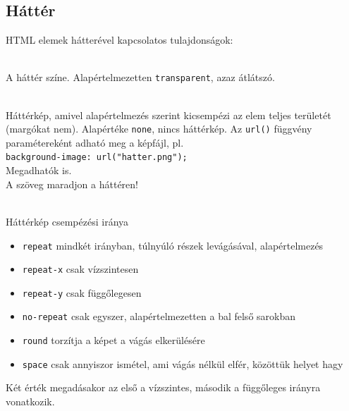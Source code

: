 \subsection{Háttér}

\begin{frame}
  HTML elemek hátterével kapcsolatos tulajdonságok:
  \begin{description}[m]
    \item[\texttt{background-color}] \hfill \\ A háttér színe. 
    Alapértelmezetten \texttt{transparent}, azaz átlátszó.
    \item[\texttt{background-image}] \hfill \\ Háttérkép, amivel 
    alapértelmezés szerint kicsempézi az elem teljes területét 
    (margókat nem). 
    Alapértéke \texttt{none}, nincs háttérkép. Az \texttt{url()} 
    függvény paramétereként adható meg a képfájl, pl. \\
    \texttt{background-image: url("hatter.png");} \\Megadhatók 
     is.\\
    A szöveg maradjon  a háttéren!
  \end{description}
\end{frame}

\begin{frame}
  \begin{description}[m]
    \item[\texttt{background-repeat}] \hfill \\ Háttérkép 
    csempézési iránya
    \begin{itemize}
      \item \texttt{repeat} mindkét irányban, túlnyúló részek 
      levágásával, alapértelmezés
      \item \texttt{repeat-x} csak vízszintesen
      \item \texttt{repeat-y} csak függőlegesen
      \item \texttt{no-repeat} csak egyszer, alapértelmezetten a bal 
      felső sarokban
      \item \texttt{round} torzítja a képet a vágás elkerülésére
      \item \texttt{space} csak annyiszor ismétel, ami vágás 
      nélkül elfér, közöttük helyet hagy
    \end{itemize}
    Két érték megadásakor az első a vízszintes, második a 
    függőleges irányra vonatkozik.
  \end{description}
\end{frame}

